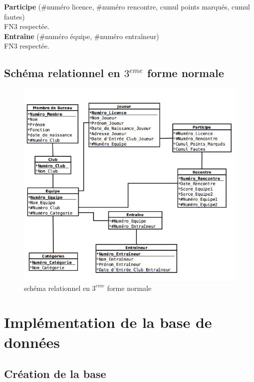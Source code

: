 \documentclass{article}
\begin{document}
\textbf{Participe} (\#numéro licence, \#numéro rencontre, cumul points marqués, cumul fautes) \\
FN3 respectée. \\


\textbf{Entraîne} (\#numéro équipe, \#numéro entraîneur) \\
FN3 respectée.

\newpage
\subsection{Schéma relationnel en $3^{eme}$ forme normale}

\begin{figure}[h!]
\begin{narrow}{-0.4in}{0in}
\includegraphics[scale = 0.9]{6.png}
\caption{schéma relationnel en $3^{eme}$ forme normale}
\end{narrow}
\end{figure}

\section{Implémentation de la base de données}
\subsection{Création de la base}
\end{document}
